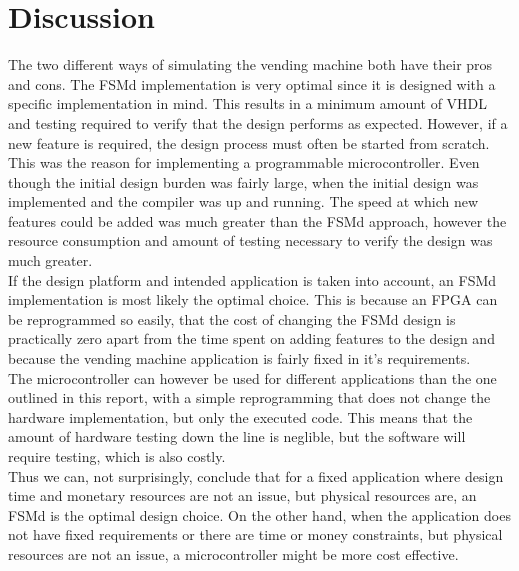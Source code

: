 \section{Discussion}
The two different ways of simulating the vending machine both have their pros and cons.
The FSMd implementation is very optimal since it is designed with a specific implementation in mind.
This results in a minimum amount of VHDL and testing required to verify that the design performs as
expected. However, if a new feature is required, the design process must often be started from scratch.
This was the reason for implementing a programmable microcontroller. Even though the initial design
burden was fairly large, when the initial design was implemented and the compiler was up and running.
The speed at which new features could be added was much greater than the FSMd approach, however the resource
consumption and amount of testing necessary to verify the design was much greater. \\

If the design platform and intended application  is taken into account, an FSMd implementation is most likely the optimal choice.
This is because an FPGA can be reprogrammed so easily, that the cost of changing the FSMd design is
practically zero apart from the time spent on adding features to the design and because the vending machine application is fairly
fixed in it's requirements.\\

The microcontroller can however be used for different applications than the one outlined in this report, with a simple
reprogramming that does not change the hardware implementation, but only the executed code. This means that the amount
of hardware testing down the line is neglible, but the software will require testing, which is also costly. \\

Thus we can, not surprisingly, conclude that for a fixed application where design time and monetary resources are not
an issue, but physical resources are, an FSMd is the optimal design choice. On the other hand, when the application
does not have fixed requirements or there are time or money constraints, but physical resources are not an issue, 
a microcontroller might be more cost effective.
